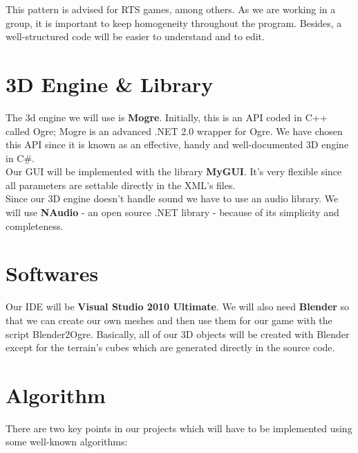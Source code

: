 \documentclass[article]{report}
\begin{document}
     						This pattern is advised for \ac{RTS} games, among others. As we are working in a group, it is important to keep homogeneity throughout the program. Besides, a well-structured code will be easier to understand and to edit.
					\section{3D Engine \& Library}
						The 3d engine we will use is \textbf{\ac{Mogre}}. Initially, this is an \ac{API} coded in C++ called Ogre; Mogre is an advanced .NET 2.0 wrapper for Ogre. We have chosen this \ac{API} since it is known as an effective, handy and well-documented 3D engine in C\#.\\			
						Our \ac{GUI} will be implemented with the library \textbf{\ac{MyGUI}}. It’s very flexible since all parameters are settable directly in the XML’s files.\\	
						Since our 3D engine doesn’t handle sound we have to use an audio library. We will use \textbf{NAudio} - an open source .NET library - because of its simplicity and completeness.
					\section{Softwares}
						Our \ac{IDE} will be \textbf{Visual Studio 2010 Ultimate}. We will also need \textbf{Blender} so that we can create our own meshes and then use them for our game with the script Blender2Ogre. Basically, all of our 3D objects will be created with Blender except for the terrain’s cubes which are generated directly in the source code.
					\section{Algorithm}
						There are two key points in our projects which will have to be implemented using some well-known algorithms:
						
\end{document}
